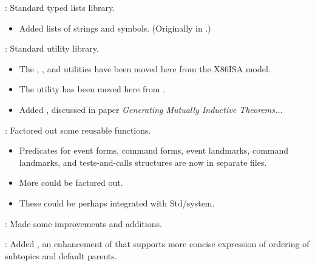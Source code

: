 
\begin{frame}

\implibtitle

:
Standard typed lists library.
\begin{itemize}
\item
Added lists of strings and symbols.
(Originally in .)
\end{itemize}

\separation

:
Standard utility library.
\begin{itemize}
\item
The
,
, and
utilities have been moved here from the X86ISA model.
\item
The  utility has been moved here
from .
\item Added , discussed in paper \textit{Generating Mutually Inductive Theorems...}
\end{itemize}

\end{frame}


\begin{frame}

\implibtitle

:
Factored out some reusable functions.
\begin{itemize}
\item
Predicates for
event forms,
command forms,
event landmarks,
command landmarks, and
tests-and-calls structures
are now in separate files.
\item
More could be factored out.
\item
These could be perhaps integrated with Std/system. 
\end{itemize}

\end{frame}


\begin{frame}

\implibtitle

:
Made some improvements and additions.

\separation

:
Added , an enhancement of 
that supports more concise expression of
ordering of subtopics and default parents.

\end{frame}



